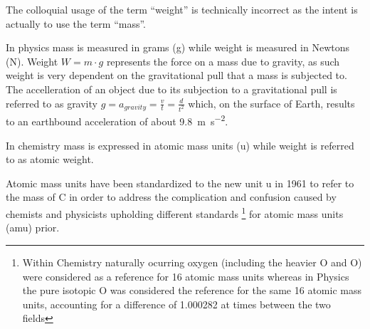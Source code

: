The colloquial usage of the term ``weight'' is technically incorrect as the
intent is actually to use the term ``mass''.

In physics mass is measured in grams (\si{\gram}) while weight is measured in
Newtons (\si{\newton}).
Weight $W = m\cdot g$ represents the force on a mass due to gravity, as such
weight is very dependent on the gravitational pull that a mass is subjected to.
The accelleration of an object due to its subjection to a gravitational pull is
referred to as gravity $g = a_{gravity} = \frac{v}{t} = \frac{d}{t^2}$ which,
on the surface of Earth, results to an earthbound acceleration of about
\SI{9.8}{\meter\second^{-2}}.

In chemistry mass is expressed in atomic mass units (\si{\atomicmassunit})
while weight is referred to as atomic weight.

Atomic mass units have been standardized to the new unit \si{\atomicmassunit}
in 1961 to refer to the mass of C in order to address the
complication and confusion caused by chemists and physicists upholding
different standards
\footnote{Within Chemistry naturally ocurring oxygen (including the heavier
O and O) were considered as a reference for 16 atomic mass
units whereas in Physics the pure isotopic O was considered the
reference for the same 16 atomic mass units, accounting for a difference of
\num{1.000282} at times between the two fields} for atomic mass units (amu)
prior.
